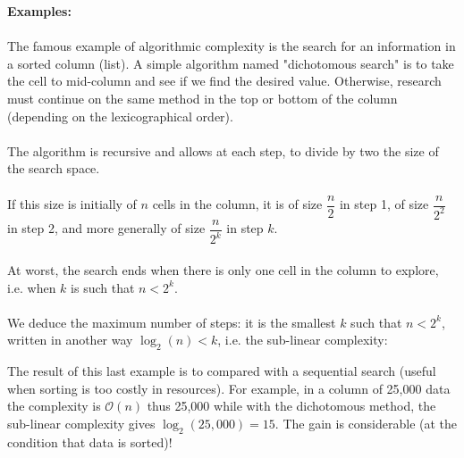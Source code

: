 	\begin{tcolorbox}[colframe=black,colback=white,sharp corners]
\textbf{{\Large {}}Examples:}\\\\
The famous example of algorithmic complexity is the search for an  information in a sorted column (list). A simple algorithm named "dichotomous search" is to take the cell to mid-column and see if we find the desired value. Otherwise, research must continue on the same method in the top or bottom of the column (depending on the lexicographical order).\\\\
The algorithm is recursive and allows at each step, to divide by two the size of the search space.\\\\
If this size is initially of $n$ cells in the column, it is of size $\dfrac{n}{2}$ in step 1, of size $\dfrac{n}{2^2}$ in step 2, and more generally of size $\dfrac{n}{2^k}$ in step $k$.\\\\
At worst, the search ends when there is only one cell in the column to explore, i.e. when $k$ is such that $n<2^k$.\\\\
We deduce the maximum number of steps: it is the smallest $k$ such that $n<2^k$, written in another way $\log_2(n)<k$, i.e. the sub-linear complexity:
	
	\end{tcolorbox}
The result of this last example is to compared with a sequential search (useful when sorting is too costly in resources). For example, in a column of 25,000 data the complexity is $\mathcal{O}(n)$ thus 25,000 while with the dichotomous method, the sub-linear complexity gives $\log_2(25,000)=15$. The gain is considerable (at the condition that data is sorted)!

